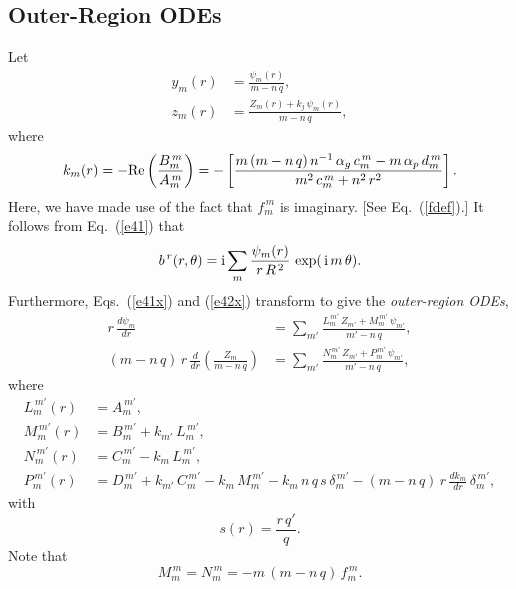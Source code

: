 \documentclass[12pt,prb,aps]{revtex4-1}
\begin{document}
\subsection{Outer-Region ODEs}\label{ode2}
Let 
\begin{align}
y_m(r) &= \frac{\psi_m(r)}{m-n\,q},\label{e115}\\[0.5ex]
z_m(r) &= \frac{Z_m(r)+k_j\,\psi_m(r)}{m-n\,q},\label{Zdef}
\end{align}
where
\begin{equation}\label{e117}
k_m(r) = -{\rm Re}\left(\frac{B_m^{\,m}}{A_m^{\,m}}\right) = -\left[\frac{m\,(m-n\,q)\,
n^{-1}\,\alpha_g\,c_m^{\,m} - m\,\alpha_p\,d_m^{\,m}}{m^2\,c_m^{\,m}+n^2\,r^2}\right].
\end{equation}
Here, we have made use of the fact that $f_m^{\,m}$ is imaginary. [See Eq.~(\ref{fdef}).] 
It follows from Eq.~(\ref{e41}) that
\begin{equation}\label{psidef}
b^{\,r}(r,\theta)= {\rm i}\sum_{m}\frac{\psi_m(r)}{r\,R^{\,2}}\,\exp(\,{\rm i}\,m\,\theta). 
\end{equation}
Furthermore, Eqs.~(\ref{e41x}) and (\ref{e42x}) transform to give the  {\em outer-region ODEs},\cite{am1,am3}
\begin{align}\label{e61x}
r\,\frac{d\psi_m}{dr} &=\sum_{m'}\frac{L_m^{\,m'}\,Z_{m'}+M_m^{\,m'}\,\psi_{m'}}{m'-n\,q},\\[0.5ex]
(m-n\,q)\,r\,\frac{d}{dr}\!\left(\frac{Z_m}{m-n\,q}\right)&=\sum_{m'}\frac{N_m^{\,m'}\,Z_{m'}+P_m^{\,m'}\,\psi_{m'}}{m'-n\,q},\label{e62x}
\end{align}
where
\begin{align}\label{e121}
L_m^{\,m'}(r) &=A_m^{\,m'},\\[0.5ex]
M_m^{\,m'}(r)& = B_m^{\,m'}+k_{m'}\,L_m^{\,m'},\\[0.5ex]
N_m^{\,m'}(r)&= C_m^{\,m'}-k_m\,L_m^{\,m'},\\[0.5ex]
P_m^{\,m'}(r) &=D_m^{\,m'}+k_{m'}\,C_m^{\,m'}  -k_m\,M_m^{\,m'}-k_m\,n\,q\,s\,\delta_m^{\,m'} - (m-n\,q)\,r\,\frac{dk_{m}}{dr}\,\delta_m^{\,m'},\label{e124}
\end{align}
with 
\begin{equation}
s(r)=\frac{r\,q'}{q}.
\end{equation}
Note that
\begin{equation}
M_m^{\,m}=N_m^{\,m} = - m\,(m-n\,q)\,f_m^{\,m}.
\end{equation}
\end{document}
